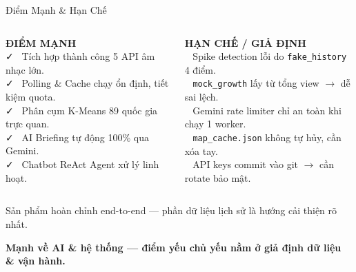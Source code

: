\documentclass[aspectratio=169,9pt]{beamer}
\newcommand{\takeaway}[1]{%
  \vfill
  \begin{mdframed}[
    linecolor=maccent, linewidth=1.5pt,
    backgroundcolor=mlightgold,
    innertopmargin=5pt, innerbottommargin=5pt,
    innerleftmargin=10pt, innerrightmargin=10pt,
    roundcorner=3pt, skipabove=4pt, skipbelow=0pt
  ]
  \centering\small\bfseries\color{mprimary} #1
  \end{mdframed}%
}
\begin{document}
\begin{frame}{Điểm Mạnh \& Hạn Chế}

\begin{columns}[T]
\begin{goodbox}
  \textbf{ĐIỂM MẠNH}\\[6pt]
  \footnotesize
  \faCheck~ Tích hợp thành công 5 API âm nhạc lớn.\\[4pt]
  \faCheck~ Polling \& Cache chạy ổn định, tiết kiệm quota.\\[4pt]
  \faCheck~ Phân cụm K-Means 89 quốc gia trực quan.\\[4pt]
  \faCheck~ AI Briefing tự động 100\% qua Gemini.\\[4pt]
  \faCheck~ Chatbot ReAct Agent xử lý linh hoạt.
\end{goodbox}

\begin{badbox}
  \textbf{HẠN CHẾ / GIẢ ĐỊNH}\\[6pt]
  \footnotesize
  \faTimes~ Spike detection lỗi do \texttt{fake\_history} 4 điểm.\\[4pt]
  \faTimes~ \texttt{mock\_growth} lấy từ tổng view $\to$ dễ sai lệch.\\[4pt]
  \faTimes~ Gemini rate limiter chỉ an toàn khi chạy 1 worker.\\[4pt]
  \faTimes~ \texttt{map\_cache.json} không tự hủy, cần xóa tay.\\[4pt]
  \faTimes~ API keys commit vào git $\to$ cần rotate bảo mật.
\end{badbox}
\end{columns}

\vspace{0.4cm}
\begin{primarybox}
  \centering\footnotesize
  Sản phẩm hoàn chỉnh end-to-end — phần dữ liệu lịch sử là hướng cải thiện rõ nhất.
\end{primarybox}

\takeaway{Mạnh về AI \& hệ thống — điểm yếu chủ yếu nằm ở giả định dữ liệu \& vận hành.}

\end{frame}
\end{document}
